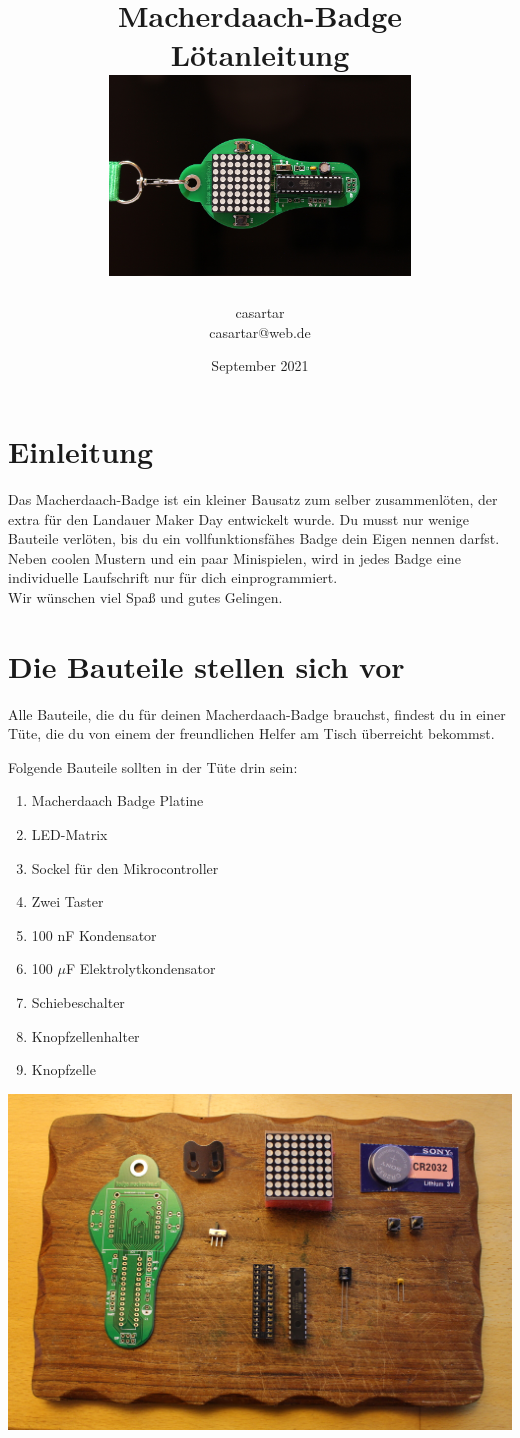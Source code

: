 \documentclass{article}
\title{Macherdaach-Badge \\ Lötanleitung \\ [1cm]
\includegraphics[width=0.6\textwidth, angle=270]{Bilder2021/IMG_8181.JPG}
}
\date{September 2021}
\author{casartar\\casartar@web.de}
\begin{document}
\maketitle
\newpage
\section{Einleitung}

Das Macherdaach-Badge ist ein kleiner Bausatz zum selber zusammenlöten, der extra für den Landauer Maker Day entwickelt wurde.
Du musst nur wenige Bauteile verlöten, bis du ein vollfunktionsfähes Badge dein Eigen nennen darfst. Neben coolen Mustern und ein paar Minispielen, wird in jedes Badge eine individuelle Laufschrift nur für dich einprogrammiert.\\

Wir wünschen viel Spaß und gutes Gelingen. 

\section{Die Bauteile stellen sich vor}
Alle Bauteile, die du für deinen Macherdaach-Badge brauchst, findest du in einer Tüte, die du von einem der freundlichen Helfer am Tisch überreicht bekommst.

Folgende Bauteile sollten in der Tüte drin sein:

\begin{enumerate}
	\item Macherdaach Badge Platine
	\item LED-Matrix
	\item Sockel für den Mikrocontroller
	\item Zwei Taster
	\item 100 nF Kondensator
	\item 100 $\mu$F Elektrolytkondensator
	\item Schiebeschalter
	\item Knopfzellenhalter
	\item Knopfzelle
\end{enumerate}

\newpage

\begin{center}
\includegraphics[width=\textwidth]{Bilder2021/IMG_8123.JPG}
\label{fig:all_components}
\end{center}
\end{document}
